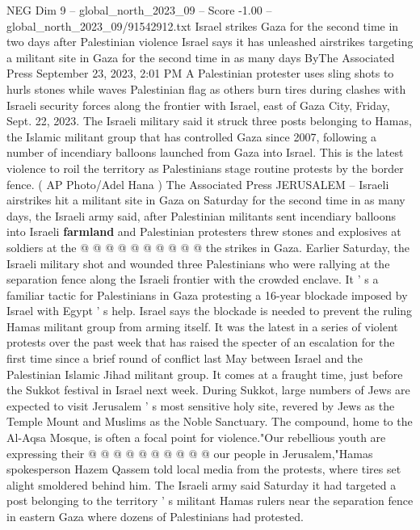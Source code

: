 \begin{textsample}{NEG Dim 9 – global\_north\_2023\_09 – Score -1.00 – global\_north\_2023\_09/91542912.txt}  \label{ex:f9_neg_045}
Israel strikes Gaza for the second time in two days after Palestinian violence Israel says it has unleashed airstrikes targeting a militant site in Gaza for the second time in as many days ByThe Associated Press September 23, 2023, 2:01 PM A Palestinian protester uses sling shots to hurls stones while waves Palestinian flag as others burn tires during clashes with Israeli security forces along the frontier with Israel, east of Gaza City, Friday, Sept. 22, 2023.
The Israeli military said it struck three posts belonging to Hamas, the Islamic militant group that has controlled Gaza since 2007, following a number of incendiary balloons launched from Gaza into Israel.
This is the latest violence to roil the territory as Palestinians stage routine protests by the border fence. ( AP Photo/Adel Hana ) The Associated Press JERUSALEM -- Israeli airstrikes hit a militant site in Gaza on Saturday for the second time in as many days, the Israeli army said, after Palestinian militants sent incendiary balloons into Israeli \textbf{farmland} and Palestinian protesters threw stones and explosives at soldiers at the @ @ @ @ @ @ @ @ @ @ the strikes in Gaza.
Earlier Saturday, the Israeli military shot and wounded three Palestinians who were rallying at the separation fence along the Israeli frontier with the crowded enclave.
It ' s a familiar tactic for Palestinians in Gaza protesting a 16-year blockade imposed by Israel with Egypt ' s help.
Israel says the blockade is needed to prevent the ruling Hamas militant group from arming itself.
It was the latest in a series of violent protests over the past week that has raised the specter of an escalation for the first time since a brief round of conflict last May between Israel and the Palestinian Islamic Jihad militant group.
It comes at a fraught time, just before the Sukkot festival in Israel next week.
During Sukkot, large numbers of Jews are expected to visit Jerusalem ' s most sensitive holy site, revered by Jews as the Temple Mount and Muslims as the Noble Sanctuary.
The compound, home to the Al-Aqsa Mosque, is often a focal point for violence."Our rebellious youth are expressing their @ @ @ @ @ @ @ @ @ @ our people in Jerusalem,"Hamas spokesperson Hazem Qassem told local media from the protests, where tires set alight smoldered behind him.
The Israeli army said Saturday it had targeted a post belonging to the territory ' s militant Hamas rulers near the separation fence in eastern Gaza where dozens of Palestinians had protested.

\end{textsample}
